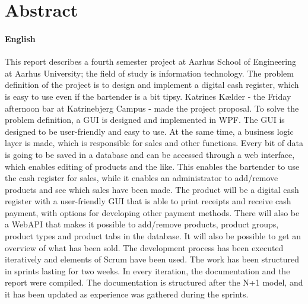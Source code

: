 \chapter{Abstract}

\subsubsection*{English}

This report describes a fourth semester project at Aarhus School of Engineering at Aarhus University; 
the field of study is information technology. 
The problem definition of the project is to design and implement a digital cash register, which is easy to use even if the bartender is a bit tipsy. 
Katrines Kælder - the Friday afternoon bar at Katrinebjerg Campus - made the project proposal.
\newline
\newline
To solve the problem definition, a \gls{GUI} is designed and implemented in \gls{WPF}. 
The \gls{GUI} is designed to be user-friendly and easy to use.
At the same time, a business logic layer is made, which is responsible for sales and other functions. 
Every bit of data is going to be saved in a database and can be accessed through a web interface, which enables editing of products and the like. 
This enables the bartender to use the cash register for sales, while it enables an administrator to add/remove products and see which sales have been made. 
\newline
\newline
The product will be a digital cash register with a user-friendly \gls{GUI} that is able to print receipts and receive cash payment, with options for developing other payment methods. 
There will also be a \gls{WebAPI} that makes it possible to add/remove products, product groups, product types and product tabs in the database. 
It will also be possible to get an overview of what has been sold. 
\newline
\newline
The development process has been executed iteratively and elements of Scrum have been used. 
The work has been structured in sprints lasting for two weeks. 
In every iteration, the documentation and the report were compiled. 
The documentation is structured after the N+1 model, and it has been updated as experience was gathered during the sprints. 